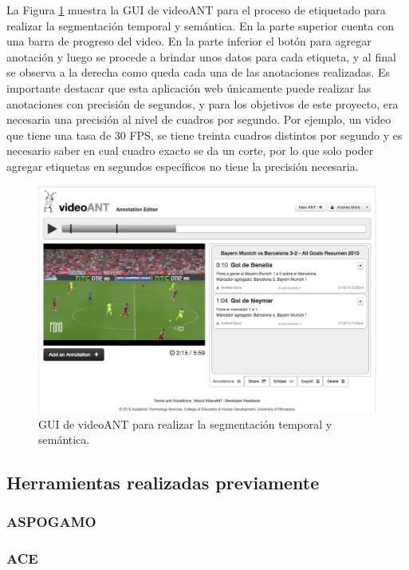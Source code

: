 La Figura \ref{fig:ant2} muestra la GUI de videoANT para el proceso de etiquetado para realizar la segmentación temporal y semántica. En la parte superior cuenta con una barra de progreso del video. En la parte inferior el botón para agregar anotación y luego se procede a brindar unos datos para cada etiqueta, y al final se observa a la derecha como queda cada una de las anotaciones realizadas. Es importante destacar que esta aplicación web únicamente puede realizar las anotaciones con precisión de segundos, y para los objetivos de este proyecto, era necesaria una precisión al nivel de cuadros por segundo. Por ejemplo, un video que tiene una tasa de 30 FPS, se tiene treinta cuadros distintos por segundo y es necesario saber en cual cuadro exacto se da un corte, por lo que solo poder agregar etiquetas en segundos específicos no tiene la precisión necesaria.

\begin{figure}
	\includegraphics[width=1\linewidth]{images/ant2}
	\caption{GUI de videoANT para realizar la segmentación temporal y semántica.} \label{fig:ant2}
\end{figure}

\subsection{Herramientas realizadas previamente}

\subsubsection{ASPOGAMO}

\subsubsection{ACE}


